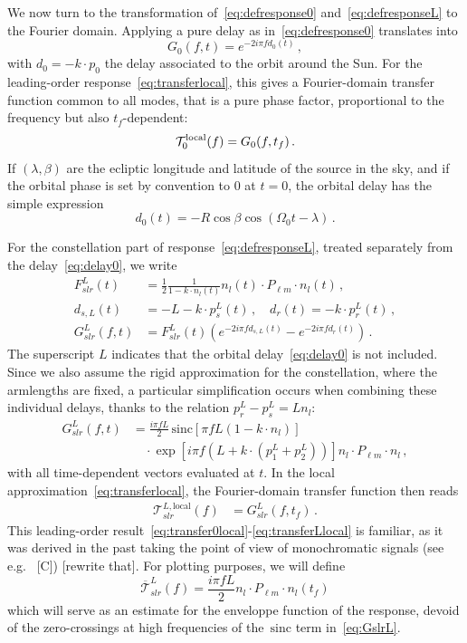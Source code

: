 \documentclass[aps,showpacs,twocolumn,
prd,superscriptaddress,nofootinbib]{revtex4-1}
\newcommand{\be}{\begin{equation}}
\newcommand{\ee}{\end{equation}}
\newcommand\calT{{\mathcal{T}}}
\newcommand{\nn}{\nonumber}
\newcommand{\hatk}{k}
\newcommand{\sinc}{\,\mathrm{sinc}}
\newcommand{\tf}{t_{f}}
\newcommand{\SM}[1]{{\color{Red} #1}}
\begin{document}
We now turn to the transformation of~\eqref{eq:defresponse0} and~\eqref{eq:defresponseL} to the Fourier domain. Applying a pure delay as in~\eqref{eq:defresponse0} translates into
\be\label{eq:G0}
	G_{0}(f, t) = e^{-2i\pi f d_{0}(t)} \,,
\ee
with $d_{0} = -\hatk \cdot p_{0}$ the delay associated to the orbit around the Sun. For the leading-order response~\eqref{eq:transferlocal}, this gives a Fourier-domain transfer function common to all modes, that is a pure phase factor, proportional to the frequency but also $t_{f}$-dependent:
\be\label{eq:transfer0local}
	\calT_{0}^{\rm local}(f) = G_{0}(f, \tf)\,.
\ee
If $(\lambda, \beta)$ are the ecliptic longitude and latitude of the source in the sky, and if the orbital phase is set by convention to $0$ at $t=0$, the orbital delay has the simple expression
\be\label{eq:delay0}
	d_{0}(t) = -R \cos\beta \cos\left(\Omega_{0}t - \lambda\right)\,.
\ee

For the constellation part of response~\eqref{eq:defresponseL}, treated separately from the delay~\eqref{eq:delay0}, we write
\begin{align}\label{eq:decomposeGslr}
	F_{slr}^{L}(t) &= \frac{1}{2} \frac{1}{1 - \hatk\cdot n_{l}(t)} n_{l}(t) \cdot P_{\ell m} \cdot n_{l} (t) \,,\nn\\
	d_{s,L}(t) &= -L - k\cdot p_{s}^{L}(t) \,, \quad d_{r}(t) = - k\cdot p_{r}^{L}(t) \,,\nn\\
	G_{slr}^{L}(f,t) &=  F_{slr}^{L}(t) \left( e^{-2i\pi f d_{s,L}(t)} - e^{-2i\pi f d_{r}(t)} \right) \,.
\end{align}
The superscript $L$ indicates that the orbital delay~\eqref{eq:delay0} is not included. Since we also assume the rigid approximation for the constellation, where the armlengths are fixed, a particular simplification occurs when combining these individual delays, thanks to the relation $p^{L}_{r} - p^{L}_{s} =  L n_{l}$:
\begin{align}\label{eq:GslrL}
	G_{slr}^{L}(f,t) &= \frac{i \pi f L}{2} \sinc \left[ \pi f L\left(1-\hatk\cdot n_{l} \right) \right] \nn\\
	& \quad \cdot \exp\left[ i \pi f \left( L + \hatk\cdot \left( p_{1}^{L} + p_{2}^{L} \right) \right) \right]  n_{l} \cdot P_{\ell m} \cdot n_{l} \,,
\end{align}
with all time-dependent vectors evaluated at $t$. In the local approximation~\eqref{eq:transferlocal}, the Fourier-domain transfer function then reads
\begin{align}\label{eq:transferLlocal}
	\calT_{slr}^{L, \mathrm{local}}(f) &= G_{slr}^{L}(f, \tf) \,.
\end{align}
This leading-order result~\eqref{eq:transfer0local}-\eqref{eq:transferLlocal} is familiar, as it was derived in the past taking the point of view of monochromatic signals (see e.g.~\cite{} \SM{[C]}) \SM{[rewrite that]}. For plotting purposes, we will define
\be\label{eq:transferLenvelope}
	\overline{\calT}_{slr}^{L} (f) = \frac{i \pi f L}{2} n_{l} \cdot P_{\ell m} \cdot n_{l} (\tf)
\ee
which will serve as an estimate for the enveloppe function of the response, devoid of the zero-crossings at high frequencies of the $\sinc$ term in~\eqref{eq:GslrL}. 
\end{document}
